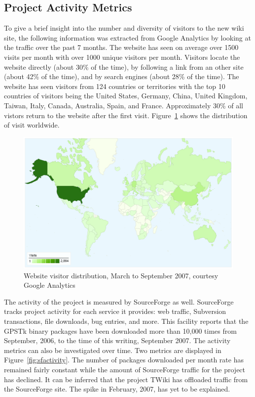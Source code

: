\documentclass[letterpaper,ugly,10pt]{ion-gps}
\begin{document}
\subsection*{Project Activity Metrics}

To give a brief insight into the number and diversity of visitors to the new wiki site, the following information was extracted from Google Analytics by looking at the traffic over the past 7 months.  The website has seen on average over 1500 visits per month with over 1000 unique visitors per month. Visitors locate the website directly (about 30\% of the time), by following a link from an other site (about 42\% of the time), and by search engines (about 28\% of the time).  The website has seen visitors from 124 countries or territories with the top 10 countries of visitors being the United States, Germany, China, United Kingdom, Taiwan, Italy, Canada, Australia, Spain, and France. Approximately 30\% of all vistors return to the website after the first visit.  Figure~\ref{fig:googleanalytics} shows the distribution of visit worldwide.
%
\begin{figure}
	\centering
	\includegraphics[width=6in,bb=0 0 535 329]{gpstk-google-analytics.eps}
	\caption{Website visitor distribution, March to September 2007, courtesy Google Analytics}
	\label{fig:googleanalytics}
\end{figure}

The activity of the project is measured by SourceForge as well. SourceForge tracks project activity for each service it provides: web traffic, Subversion transactions, file downloads, bug entries, and more. This facility reports that the GPSTk binary packages have been downloaded more than 10,000 times from September, 2006, to the time of this writing, September 2007. The activity metrics can also be investigated over time. Two metrics are displayed in Figure~\ref{fig:sfactivity}. The number of packages downloaded per month rate has remained fairly constant while the amount of SourceForge traffic for the project has declined. It can be inferred that the project TWiki has offloaded traffic from the SourceForge site. The spike in February, 2007, has yet to be explained.
\end{document}
